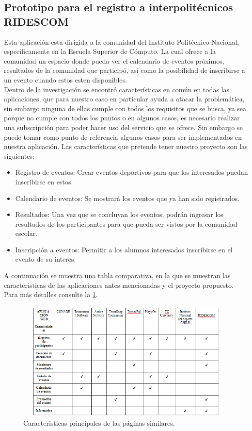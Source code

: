 \subsection{Prototipo para el registro a interpolitécnicos RIDESCOM}
\noindent Esta aplicación esta dirigida a la comunidad del Instituto Politécnico Nacional, especificamente en la Escuela Superior de Cómputo. La cual ofrece a la comunidad un espacio donde pueda ver el calendario de eventos próximos, resultados de la comunidad que participó, así como la posibilidad de inscribirse a un evento cuando estos esten disponibles. 
\\Dentro de la investigación se encontró características en común en todas las aplicaciones, que para nuestro caso en particular ayuda a atacar la problemática, sin embargo ninguna de ellas cumple con todos los requisitos que se busca, ya sea porque no cumple con todos los puntos o en algunos casos, es necesario realizar una subscripción para poder hacer uso del servicio que se ofrece. Sin embargo se puede tomar como punto de referencia algunos casos para ser implementados en nuestra aplicación.
Las características que pretende tener nuestro proyecto son las siguientes:
\begin{itemize}
	\item Registro de eventos: Crear eventos deportivos para que los interesados puedan inscribirse en estos.
	\item Calendario de eventos: Se mostrará los eventos que ya han sido registrados.
	\item Resultados: Una vez que se concluyan los eventos, podrán ingresar los resultados de los participantes para que pueda ser vistos por la comunidad escolar.
	\item Inscripción a eventos: Permitir a los alumnos interesados inscribirse en el evento de su interes. 
\end{itemize}

A continuación se muestra una tabla comparativa, en la que se muestran las caracteristicas de las aplicaciones antes mencionadas y el proyecto propuesto. Para más detalles consulte la \ref{tablacomparativa}.

\begin{figure} [hbt!]
	\centering
	\includegraphics[width=15cm, height=6cm]{Imagenes/tablaComparativa}
	\caption{Caracteristicas principales de las páginas similares.}
	\label{tablacomparativa}
\end{figure}

